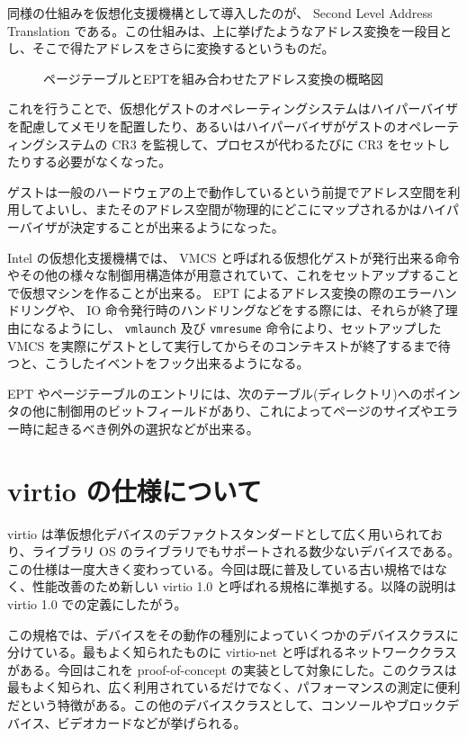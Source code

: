 \documentclass[a4paper,11pt,report]{ltjsbook}
\begin{document}
同様の仕組みを仮想化支援機構として導入したのが、 Second Level Address Translation である。この仕組みは、上に挙げたようなアドレス変換を一段目とし、そこで得たアドレスをさらに変換するというものだ。


\begin{figure}[htbp]
  \begin{center}
		\resizebox{\textwidth}{!}{
		
	}
  \end{center}
  \caption{ページテーブルとEPTを組み合わせたアドレス変換の概略図}
\end{figure}

これを行うことで、仮想化ゲストのオペレーティングシステムはハイパーバイザを配慮してメモリを配置したり、あるいはハイパーバイザがゲストのオペレーティングシステムの CR3 を監視して、プロセスが代わるたびに CR3 をセットしたりする必要がなくなった。

ゲストは一般のハードウェアの上で動作しているという前提でアドレス空間を利用してよいし、またそのアドレス空間が物理的にどこにマップされるかはハイパーバイザが決定することが出来るようになった。

Intel の仮想化支援機構では、 VMCS と呼ばれる仮想化ゲストが発行出来る命令やその他の様々な制御用構造体が用意されていて、これをセットアップすることで仮想マシンを作ることが出来る。 EPT によるアドレス変換の際のエラーハンドリングや、 IO 命令発行時のハンドリングなどをする際には、それらが終了理由になるようにし、 \texttt{vmlaunch} 及び \texttt{vmresume} 命令により、セットアップした VMCS を実際にゲストとして実行してからそのコンテキストが終了するまで待つと、こうしたイベントをフック出来るようになる。

EPT やページテーブルのエントリには、次のテーブル(ディレクトリ)へのポインタの他に制御用のビットフィールドがあり、これによってページのサイズやエラー時に起きるべき例外の選択などが出来る。

\section{virtio の仕様について}

virtio は準仮想化デバイスのデファクトスタンダードとして広く用いられており、ライブラリ OS のライブラリでもサポートされる数少ないデバイスである。この仕様は一度大きく変わっている。今回は既に普及している古い規格ではなく、性能改善のため新しい virtio 1.0 と呼ばれる規格に準拠する。以降の説明は virtio 1.0\cite{virtio_spec} での定義にしたがう。

この規格では、デバイスをその動作の種別によっていくつかのデバイスクラスに分けている。最もよく知られたものに virtio-net と呼ばれるネットワーククラスがある。今回はこれを proof-of-concept の実装として対象にした。このクラスは最もよく知られ、広く利用されているだけでなく、パフォーマンスの測定に便利だという特徴がある。この他のデバイスクラスとして、コンソールやブロックデバイス、ビデオカードなどが挙げられる。
\end{document}
